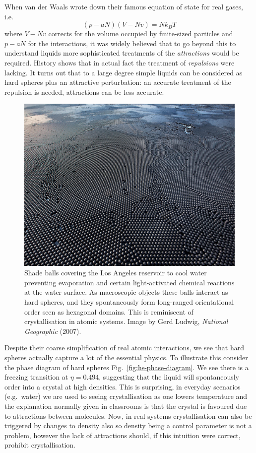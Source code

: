 \documentclass[11pt,twoside]{report}
\begin{document}
When van der Waals wrote down their famous equation of state for real gases, i.e.\
\begin{equation}
  (p - a N)(V - Nv) = N k_B T
\end{equation}
where $V - Nv$ corrects for the volume occupied by finite-sized particles and $p - aN$ for the interactions,
it was widely believed that to go beyond this to understand liquids more sophisticated treatments of the \emph{attractions} would be required.
History shows that in actual fact the treatment of \emph{repulsions} were lacking.
It turns out that to a large degree simple liquids can be considered as hard spheres plus an attractive perturbation: an accurate treatment of the repulsion is needed, attractions can be less accurate.

\begin{figure}
  \includegraphics[width=0.75\linewidth,outer]{shade-balls}
  \caption[Shade balls floating on water: a 2d `crystal']{
    Shade balls covering the Los Angeles reservoir to cool water preventing evaporation and certain light-activated chemical reactions at the water surface.
    As macroscopic objects these balls interact as hard spheres, and they spontaneously form long-ranged orientational order seen as hexagonal domains.
    This is reminiscent of crystallisation in atomic systems.
    Image by Gerd Ludwig, \emph{National Geographic} (2007).}
  \label{fig:shade-balls}
\end{figure}

Despite their coarse simplification of real atomic interactions, we see that hard spheres actually capture a lot of the essential physics.
To illustrate this consider the phase diagram of hard spheres Fig.\ \ref{fig:hs-phase-diagram}.
We see there is a freezing transition at $\eta = 0.494$, suggesting that the liquid will spontaneously order into a crystal at high densities.
This is surprising, in everyday scenarios (e.g.\ water) we are used to seeing crystallisation as one lowers temperature and the explanation normally given in classrooms is that the crystal is favoured due to attractions between molecules.
Now, in real systems crystallisation can also be triggered by changes to density also so density being a control parameter is not a problem, however the lack of attractions should, if this intuition were correct, prohibit crystallisation.
\end{document}

